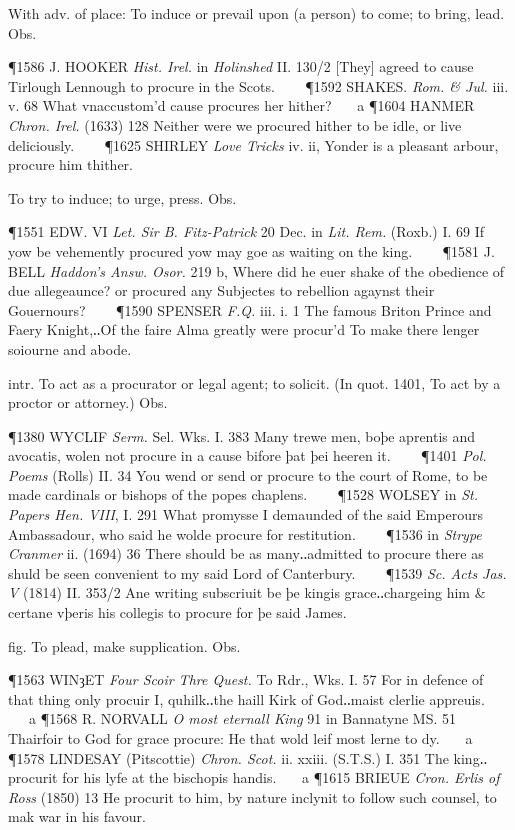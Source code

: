 \begin{description}[wide, labelwidth=!, labelindent=0pt]
\begin{myenumerate}
 With adv. of place: To induce or prevail upon (a person) to come; to bring, lead. Obs.

\P 1586 J. HOOKER  \textit{Hist. Irel.} in \textit{Holinshed} II. 130/2 [They] agreed to cause Tirlough Lennough to procure in the Scots.    
\P 1592 SHAKES.  \textit{Rom. \& Jul.} iii. v. 68 What vnaccustom'd cause procures her hither?    a 
\P 1604 HANMER  \textit{Chron. Irel.} (1633) 128 Neither were we procured hither to be idle, or live deliciously.    
\P 1625 SHIRLEY  \textit{Love Tricks} iv. ii, Yonder is a pleasant arbour, procure him thither.

 To try to induce; to urge, press. Obs.

\P 1551 EDW. VI \textit{Let. Sir B. Fitz-Patrick} 20 Dec. in \textit{Lit. Rem.} (Roxb.) I. 69 If yow be vehemently procured yow may goe as waiting on the king.    
\P 1581 J. BELL  \textit{Haddon's Answ. Osor.} 219 b, Where did he euer shake of the obedience of due allegeaunce? or procured any Subjectes to rebellion agaynst their Gouernours?    
\P 1590 SPENSER  \textit{F.Q.} iii. i. 1 The famous Briton Prince and Faery Knight,‥Of the faire Alma greatly were procur'd To make there lenger soiourne and abode.

 intr. To act as a procurator or legal agent; to solicit. (In quot. 1401, To act by a proctor or attorney.) Obs.

\P 1380 WYCLIF  \textit{Serm.} Sel. Wks. I. 383 Many trewe men, boþe aprentis and avocatis, wolen not procure in a cause bifore þat þei heeren it.    
\P 1401  \textit{Pol. Poems} (Rolls) II. 34 You wend or send or procure to the court of Rome, to be made cardinals or bishops of the popes chaplens.    
\P 1528 WOLSEY in  \textit{St. Papers Hen. VIII}, I. 291 What promysse I demaunded of the said Emperours Ambassadour, who said he wolde procure for restitution.    
\P 1536 in  \textit{Strype Cranmer} ii. (1694) 36 There should be as many‥admitted to procure there as shuld be seen convenient to my said Lord of Canterbury.    
\P 1539  \textit{Sc. Acts Jas. V} (1814) II. 353/2 Ane writing subscriuit be þe kingis grace‥chargeing him \& certane vþeris his collegis to procure for þe said James.

 fig. To plead, make supplication. Obs.

\P 1563 WINȝET  \textit{Four Scoir Thre Quest.} To Rdr., Wks. I. 57 For in defence of that thing only procuir I, quhilk‥the haill Kirk of God‥maist clerlie appreuis.    a 
\P 1568 R. NORVALL  \textit{O most eternall King} 91 in Bannatyne MS. 51 Thairfoir to God for grace procure: He that wold leif most lerne to dy.    a 
\P 1578 LINDESAY  (Pitscottie) \textit{Chron. Scot.} ii. xxiii. (S.T.S.) I. 351 The king‥procurit for his lyfe at the bischopis handis.    a 
\P 1615 BRIEUE  \textit{Cron. Erlis of Ross} (1850) 13 He procurit to him, by nature inclynit to follow such counsel, to mak war in his favour.


\end{myenumerate}
\end{description}
